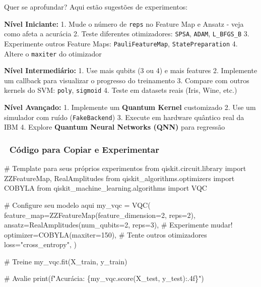 \documentclass[
  brazilian,
]{report}
\newenvironment{Shaded}{\begin{snugshade}}{\end{snugshade}}
\newcommand{\BuiltInTok}[1]{\textcolor[rgb]{0.00,0.23,0.31}{#1}}
\newcommand{\CommentTok}[1]{\textcolor[rgb]{0.37,0.37,0.37}{#1}}
\newcommand{\DecValTok}[1]{\textcolor[rgb]{0.68,0.00,0.00}{#1}}
\newcommand{\ImportTok}[1]{\textcolor[rgb]{0.00,0.46,0.62}{#1}}
\newcommand{\NormalTok}[1]{\textcolor[rgb]{0.00,0.23,0.31}{#1}}
\newcommand{\OperatorTok}[1]{\textcolor[rgb]{0.37,0.37,0.37}{#1}}
\newcommand{\SpecialCharTok}[1]{\textcolor[rgb]{0.37,0.37,0.37}{#1}}
\newcommand{\SpecialStringTok}[1]{\textcolor[rgb]{0.13,0.47,0.30}{#1}}
\newcommand{\StringTok}[1]{\textcolor[rgb]{0.13,0.47,0.30}{#1}}
\begin{document}
Quer se aprofundar? Aqui estão sugestões de experimentos:

\textbf{Nível Iniciante:} 1. Mude o número de \texttt{reps} no Feature
Map e Ansatz - veja como afeta a acurácia 2. Teste diferentes
otimizadores: \texttt{SPSA}, \texttt{ADAM}, \texttt{L\_BFGS\_B} 3.
Experimente outros Feature Maps: \texttt{PauliFeatureMap},
\texttt{StatePreparation} 4. Altere o \texttt{maxiter} do otimizador

\textbf{Nível Intermediário:} 1. Use mais qubits (3 ou 4) e mais
features 2. Implemente um callback para visualizar o progresso do
treinamento 3. Compare com outros kernels do SVM: \texttt{poly},
\texttt{sigmoid} 4. Teste em datasets reais (Iris, Wine, etc.)

\textbf{Nível Avançado:} 1. Implemente um \textbf{Quantum Kernel}
customizado 2. Use um simulador com ruído (\texttt{FakeBackend}) 3.
Execute em hardware quântico real da IBM 4. Explore \textbf{Quantum
Neural Networks (QNN)} para regressão

\subsubsection{📖 Código para Copiar e
Experimentar}\label{cuxf3digo-para-copiar-e-experimentar}

\begin{Shaded}
\begin{Highlighting}[]
\CommentTok{\# Template para seus próprios experimentos}
\ImportTok{from}\NormalTok{ qiskit.circuit.library }\ImportTok{import}\NormalTok{ ZZFeatureMap, RealAmplitudes}
\ImportTok{from}\NormalTok{ qiskit\_algorithms.optimizers }\ImportTok{import}\NormalTok{ COBYLA}
\ImportTok{from}\NormalTok{ qiskit\_machine\_learning.algorithms }\ImportTok{import}\NormalTok{ VQC}

\CommentTok{\# Configure seu modelo aqui}
\NormalTok{my\_vqc }\OperatorTok{=}\NormalTok{ VQC(}
\NormalTok{    feature\_map}\OperatorTok{=}\NormalTok{ZZFeatureMap(feature\_dimension}\OperatorTok{=}\DecValTok{2}\NormalTok{, reps}\OperatorTok{=}\DecValTok{2}\NormalTok{),}
\NormalTok{    ansatz}\OperatorTok{=}\NormalTok{RealAmplitudes(num\_qubits}\OperatorTok{=}\DecValTok{2}\NormalTok{, reps}\OperatorTok{=}\DecValTok{3}\NormalTok{),  }\CommentTok{\# Experimente mudar!}
\NormalTok{    optimizer}\OperatorTok{=}\NormalTok{COBYLA(maxiter}\OperatorTok{=}\DecValTok{150}\NormalTok{),  }\CommentTok{\# Tente outros otimizadores}
\NormalTok{    loss}\OperatorTok{=}\StringTok{"cross\_entropy"}\NormalTok{,}
\NormalTok{)}

\CommentTok{\# Treine}
\NormalTok{my\_vqc.fit(X\_train, y\_train)}

\CommentTok{\# Avalie}
\BuiltInTok{print}\NormalTok{(}\SpecialStringTok{f"Acurácia: }\SpecialCharTok{\{}\NormalTok{my\_vqc}\SpecialCharTok{.}\NormalTok{score(X\_test, y\_test)}\SpecialCharTok{:.4f\}}\SpecialStringTok{"}\NormalTok{)}
\end{Highlighting}
\end{Shaded}
\end{document}
